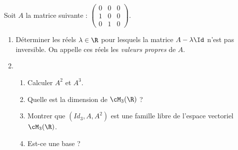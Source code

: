 



\begin{exercice}
Soit $A$ la matrice suivante : 
$\left(\begin{array}{ccc}
0&0&0\\
1&0&0\\
0&1&0
\end{array}
\right).$
\begin{enumerate}
\item Déterminer les réels $\lambda\in \R$ pour lesquels la matrice $A-\lambda \Id$ n'est pas  inversible. On appelle ces réels les \emph{valeurs propres} de $A$. 
\item
\begin{enumerate}
\item  Calculer $A^2$ et $A^3$. 
\item Quelle est la dimension de $\cM_3(\R)$ ? 
\item Montrer que $(Id_3, A, A^2)$ est une famille libre de l'espace vectoriel $\cM_3(\R)$.
\item Est-ce une base ? 
\end{enumerate}


\end{enumerate}
\end{exercice}
